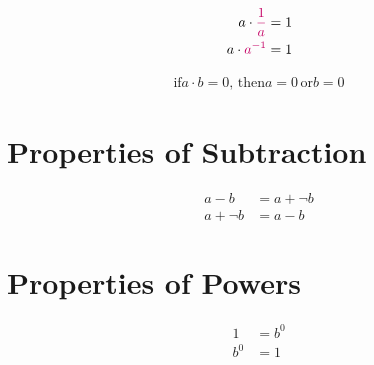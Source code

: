 \documentclass[20150903-160354-rs2.2-MarksMathNotebook.tex]{subfiles}
\begin{document}
\begin{property}
\begin{subequations}
\begin{align}
a \cdot \alert{\dfrac{1}{a}} &= 1 \label{eq:mi1} \\
a \cdot \alert{a^{-1}} &= 1 \label{eq:mi2}
\end{align}
\end{subequations}
\end{property}

\begin{property}
\begin{subequations}
\begin{align}
\text{if} a \cdot b =0, \,\text{then} a=0 \,\text{or} b=0 \label{eq:zpr}
\end{align}
\end{subequations}
\end{property}



\section{Properties of Subtraction}

\begin{definition}
\begin{subequations}
\begin{align}
a-b &= a+\neg b \label{eq:dos1} \\
a+\neg b &= a-b \label{eq:dos2}
\end{align}
\end{subequations}
\end{definition}

\section{Properties of Powers}


\begin{property}
\begin{subequations}
\begin{align}
1&= b^0  \label{eq:poid1} \\
b^{0}&= 1  \label{eq:poid2}
\end{align}
\end{subequations}
\end{property}
\end{document}
